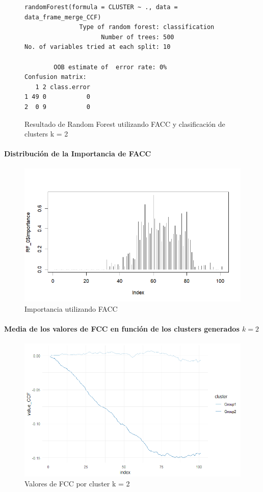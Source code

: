 \begin{figure}[H]
    \centering
    \begin{lstlisting}[frame=single, basicstyle=\small\ttfamily]
        randomForest(formula = CLUSTER ~ ., data = data_frame_merge_CCF) 
               Type of random forest: classification
                     Number of trees: 500
No. of variables tried at each split: 10

        OOB estimate of  error rate: 0%
Confusion matrix:
   1 2 class.error
1 49 0           0
2  0 9           0
    \end{lstlisting}
    \caption{Resultado de Random Forest utilizando FACC y clasificación de clusters k = 2}\label{fig:random_forest_ccf_result_RF_1}
\end{figure}

\paragraph{Distribución de la Importancia de FACC}

\begin{figure}[H]
    \centering
    \includegraphics[scale = 0.8]{img/06-5-ccf.png}
    \caption{Importancia utilizando FACC}
    \label{fig:ccf_imp}
\end{figure}

\paragraph{Media de los valores de FCC en función de los clusters generados $k = 2$}

\begin{figure}[H]
    \centering
    \includegraphics[scale = 0.8]{img/06-6-ccf.png}
    \caption{Valores de FCC por cluster k = 2 }
    \label{fig:ccf_cls}
\end{figure}